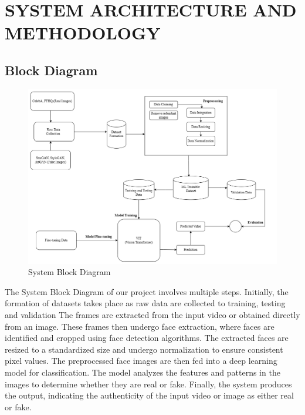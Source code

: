 \section{SYSTEM ARCHITECTURE AND METHODOLOGY }
\subsection{Block Diagram}
\begin{figure}[h]
    \centering
    \includegraphics[width= 6.5in ]{img/Model_Architecture.drawio (4).png}
    \caption{{System Block Diagram}}

\end{figure}
\justify
The System Block Diagram of our project involves multiple steps. Initially, the formation of datasets takes place as raw data are collected to training, testing and validation  The frames are extracted from the input video or obtained directly from an image. These frames then undergo face extraction, where faces are identified and cropped using face detection algorithms. The extracted faces are resized to a standardized size and undergo normalization to ensure consistent pixel values. The preprocessed face images are then fed into a deep learning model for classification. The model analyzes the features and patterns in the images to determine whether they are real or fake. Finally, the system produces the output, indicating the authenticity of the input video or image as either real or fake.
